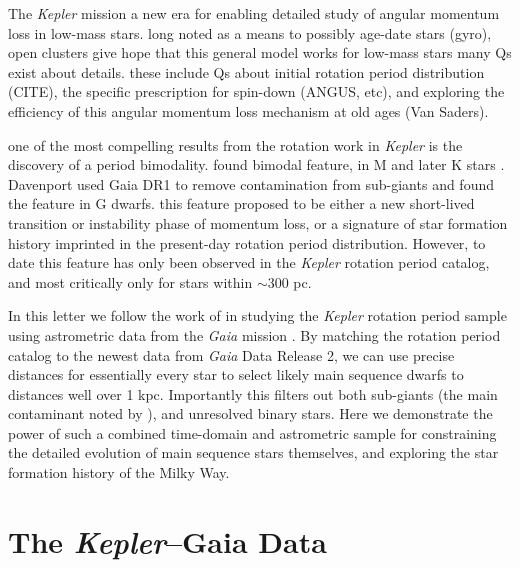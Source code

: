 \documentclass[preprint2]{aastex62}
\newcommand{\Kepler}{\textsl{Kepler}\xspace}
\begin{document}
The \Kepler mission \citep{borucki2010} a new era for enabling detailed study of angular momentum loss in low-mass stars. long noted as a means to possibly age-date stars (gyro), open clusters give hope that this general model works for low-mass stars
many Qs exist about details. these include Qs about initial rotation period distribution (CITE), the specific prescription for spin-down (ANGUS, etc), and exploring the efficiency of this angular momentum loss mechanism at old ages (Van Saders).


one of the most compelling results from the rotation work in \Kepler is the discovery of a period bimodality. 
\citet{mcquillan2013} found bimodal feature, in M and later K stars \citep{mcquillan2014}. Davenport used Gaia DR1 to remove contamination from sub-giants and found the feature in G dwarfs. this feature proposed to be either a new short-lived transition or instability phase of momentum loss, or a signature of star formation history imprinted in the present-day rotation period distribution. However, to date this feature has only been observed in the \Kepler rotation period catalog, and most critically only for stars within $\sim$300 pc.




In this letter we follow the work of \citet{davenport2017} in studying the \Kepler rotation period sample using astrometric data from the {\em Gaia} mission \citep{gaia}. By matching the \citet{mcquillan2014} rotation period catalog to the newest data from {\em Gaia} Data Release 2, we can use precise distances for essentially every star to select likely main sequence dwarfs to distances well over 1 kpc. Importantly this filters out both sub-giants (the main contaminant noted by \cite{davenport2017}), and unresolved binary stars.
Here we demonstrate the power of such a combined time-domain and astrometric sample for constraining the detailed evolution of main sequence stars themselves, and exploring the star formation history of the Milky Way.



 



\section{The \Kepler--Gaia Data}
\end{document}
